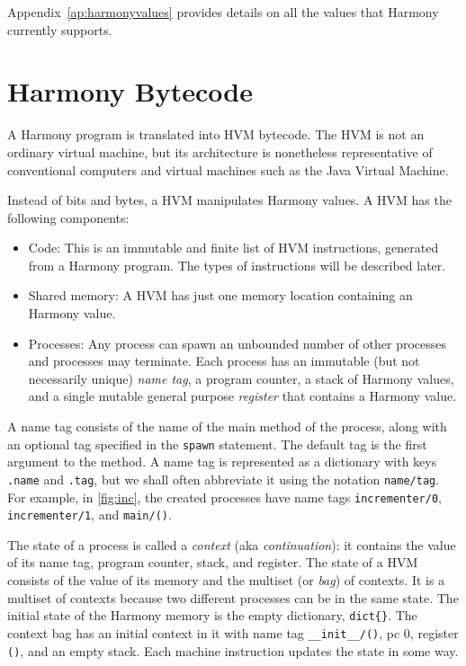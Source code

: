\documentclass{report}
\begin{document}
Appendix~\ref{ap:harmonyvalues} provides details on all the values that
Harmony currently supports.

\section*{Harmony Bytecode}

A Harmony program is translated into HVM bytecode.
The HVM is not an ordinary virtual machine, but its architecture
is nonetheless representative of conventional computers and
virtual machines such as the Java Virtual Machine.

Instead of bits and bytes, a HVM manipulates Harmony values.
A HVM has the following components:
\begin{itemize}
\item Code:  This is an immutable and finite list of HVM instructions,
generated from a Harmony program.  The types of instructions will be described later.
\item Shared memory: A HVM has just one memory location containing
an Harmony value.
\item Processes:  Any process
can spawn an unbounded number of other processes and processes may terminate.
Each process has an immutable (but not necessarily unique) \emph{name tag},
%
a program counter,
%
a stack of Harmony values,
and a single mutable general purpose \emph{register}
%
that contains a Harmony value.
\end{itemize}

A name tag consists of the name of the main method of the process,
along with an optional tag specified in the \texttt{spawn}
%
%
statement.
The default tag is the first argument to the method.
A name tag is represented as a dictionary with keys \texttt{.name}
and \texttt{.tag}, but we shall often abbreviate it using the notation
\texttt{name/tag}.
For example, in \autoref{fig:inc}, the created processes have name tags
\texttt{incrementer/0}, \texttt{incrementer/1}, and \texttt{main/()}.

%

The state of a process is called a \emph{context} (aka \emph{continuation}):
%
%
it contains the value of
its name tag, program counter, stack, and register.
The state of a HVM
consists of the value of its memory and the multiset (or \emph{bag})
%
%
of contexts.  It is a multiset of contexts because two different processes can
be in the same state.
The initial state of the Harmony memory is the empty dictionary, \texttt{dict\{\}}.
The context bag has an initial context in it with name tag
\texttt{\_\_init\_\_/()}, pc 0, register \texttt{()}, and an empty stack.
Each machine instruction updates the state in some way.
\end{document}
